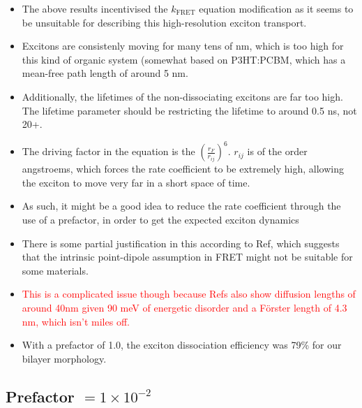 \documentclass[12pt]{article}
\begin{document}
\begin{itemize}
    \item{The above results incentivised the $k_{\text{FRET}}$ equation modification as it seems to be unsuitable for describing this high-resolution exciton transport.}
    \item{Excitons are consistenly moving for many tens of nm, which is too high for this kind of organic system (somewhat based on P3HT:PCBM, which has a mean-free path length of around 5 nm.}
    \item{Additionally, the lifetimes of the non-dissociating excitons are far too high. The lifetime parameter should be restricting the lifetime to around 0.5 ns, not 20+.}
    \item{The driving factor in the equation is the $(\frac{r_{F}}{r_{ij}})^{6}$. $r_{ij}$ is of the order angstroems, which forces the rate coefficient to be extremely high, allowing the exciton to move very far in a short space of time.}
    \item{As such, it might be a good idea to reduce the rate coefficient through the use of a prefactor, in order to get the expected exciton dynamics}
    \item{There is some partial justification in this according to Ref\cite{Feron2012a}, which suggests that the intrinsic point-dipole assumption in FRET might not be suitable for some materials.}
    \item{\textcolor{red}{This is a complicated issue though because Refs\cite{Athanasopoulos2009,Feron2012a} also show diffusion lengths of around 40nm given 90 meV of energetic disorder and a F\"orster length of 4.3 nm, which isn't miles off.}}
    \item{With a prefactor of 1.0, the exciton dissociation efficiency was 79\% for our bilayer morphology.}
\end{itemize}

\clearpage

\subsection{Prefactor $= 1 \times 10^{-2}$}
\end{document}
